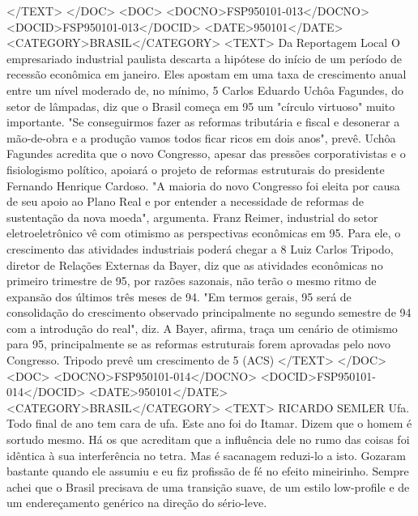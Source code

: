 </TEXT>
</DOC>
<DOC>
<DOCNO>FSP950101-013</DOCNO>
<DOCID>FSP950101-013</DOCID>
<DATE>950101</DATE>
<CATEGORY>BRASIL</CATEGORY>
<TEXT>
Da Reportagem Local 
O empresariado industrial paulista descarta a hipótese do início de um período de recessão econômica em janeiro.
Eles apostam em uma taxa de crescimento anual entre um nível moderado de, no mínimo, 5%
Carlos Eduardo Uchôa Fagundes, do setor de lâmpadas, diz que o Brasil começa em 95 um "círculo virtuoso" muito importante.
"Se conseguirmos fazer as reformas tributária e fiscal e desonerar a mão-de-obra e a produção vamos todos ficar ricos em dois anos", prevê.
Uchôa Fagundes acredita que o novo Congresso, apesar das pressões corporativistas e o fisiologismo político, apoiará o projeto de reformas estruturais do presidente Fernando Henrique Cardoso.
"A maioria do novo Congresso foi eleita por causa de seu apoio ao Plano Real e por entender a necessidade de reformas de sustentação da nova moeda", argumenta.
Franz Reimer, industrial do setor eletroeletrônico vê com otimismo as perspectivas econômicas em 95. Para ele, o crescimento das atividades industriais poderá chegar a 8%
Luiz Carlos Tripodo, diretor de Relações Externas da Bayer, diz que as atividades econômicas no primeiro trimestre de 95, por razões sazonais, não terão o mesmo ritmo de expansão dos últimos três meses de 94.
"Em termos gerais, 95 será de consolidação do crescimento observado principalmente no segundo semestre de 94 com a introdução do real", diz. A Bayer, afirma, traça um cenário de otimismo para 95, principalmente se as reformas estruturais forem aprovadas pelo novo Congresso.
Tripodo prevê um crescimento de 5%
(ACS)
</TEXT>
</DOC>
<DOC>
<DOCNO>FSP950101-014</DOCNO>
<DOCID>FSP950101-014</DOCID>
<DATE>950101</DATE>
<CATEGORY>BRASIL</CATEGORY>
<TEXT>
RICARDO SEMLER 
Ufa. Todo final de ano tem cara de ufa. Este ano foi do Itamar. Dizem que o homem é sortudo mesmo. Há os que acreditam que a influência dele no rumo das coisas foi idêntica à sua interferência no tetra. Mas é sacanagem reduzi-lo a isto.
Gozaram bastante quando ele assumiu e eu fiz profissão de fé no efeito mineirinho. Sempre achei que o Brasil precisava de uma transição suave, de um estilo low-profile e de um endereçamento genérico na direção do sério-leve.
